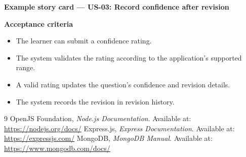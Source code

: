 \documentclass[12pt,a4paper]{report}
\begin{document}
\textbf{Example story card — US-03: Record confidence after revision}

\textbf{Acceptance criteria}
\begin{itemize}
\item The learner can submit a confidence rating.
\item The system validates the rating according to the application's supported range.
\item A valid rating updates the question's confidence and revision details.
\item The system records the revision in revision history.
\end{itemize}

\begin{thebibliography}{9}
 OpenJS Foundation, \textit{Node.js Documentation}. Available at:
\url{https://nodejs.org/docs/}
 Express.js, \textit{Express Documentation}. Available at:
\url{https://expressjs.com/}
 MongoDB, \textit{MongoDB Manual}. Available at:
\url{https://www.mongodb.com/docs/}
\end{thebibliography}
\end{document}
